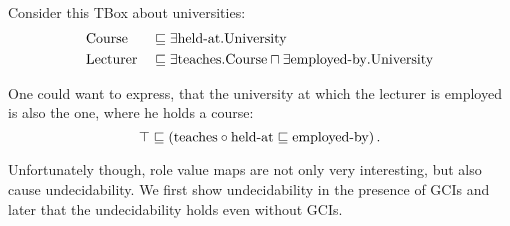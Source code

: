 \begin{example}
	Consider this TBox about universities:
	\begin{alignat*}{2}
		& \var{Course} &&\sqsubseteq \exists \var{held-at}.\var{University} \\
		& \var{Lecturer} &&\sqsubseteq \exists \var{teaches}.\var{Course} \sqcap \exists \var{employed-by}.\var{University}
	\end{alignat*}

	One could want to express, that the university at which the lecturer is employed is also the one, where he holds a course:
	\[
		\top \sqsubseteq \left( \var{teaches} \circ \var{held-at} \sqsubseteq \var{employed-by} \right)
	.\]
\end{example}
Unfortunately though, role value maps are not only very interesting, but also cause undecidability.
We first show undecidability in the presence of GCIs and later that the undecidability holds even without GCIs.

